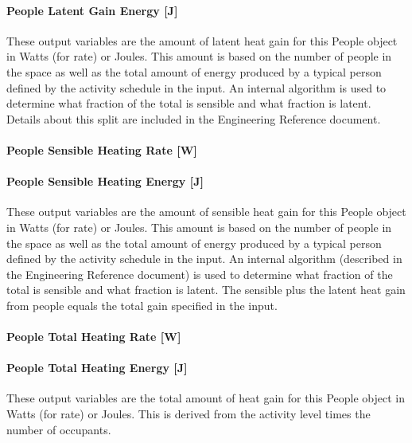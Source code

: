 \paragraph{People Latent Gain Energy {[}J{]}}\label{people-latent-gain-energy-j}

These output variables are the amount of latent heat gain for this People object in Watts (for rate) or Joules. This amount is based on the number of people in the space as well as the total amount of energy produced by a typical person defined by the activity schedule in the input. An internal algorithm is used to determine what fraction of the total is sensible and what fraction is latent. Details about this split are included in the Engineering Reference document.

\paragraph{People Sensible Heating Rate {[}W{]}}\label{people-sensible-heating-rate-w}

\paragraph{People Sensible Heating Energy {[}J{]}}\label{people-sensible-heating-energy-j}

These output variables are the amount of sensible heat gain for this People object in Watts (for rate) or Joules. This amount is based on the number of people in the space as well as the total amount of energy produced by a typical person defined by the activity schedule in the input. An internal algorithm (described in the Engineering Reference document) is used to determine what fraction of the total is sensible and what fraction is latent. The sensible plus the latent heat gain from people equals the total gain specified in the input.

\paragraph{People Total Heating Rate {[}W{]}}\label{people-total-heating-rate-w}

\paragraph{People Total Heating Energy {[}J{]}}\label{people-total-heating-energy-j}

These output variables are the total amount of heat gain for this People object in Watts (for rate) or Joules. This is derived from the activity level times the number of occupants.


